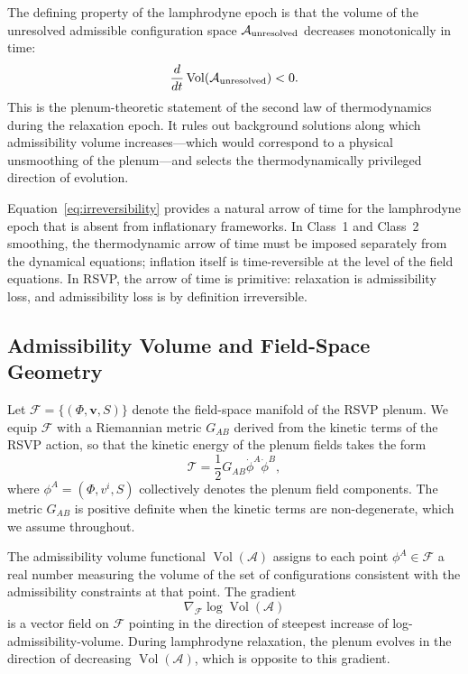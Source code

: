 \documentclass[12pt, a4paper]{article}
\newcommand{\vv}{\mathbf{v}}
\newcommand{\calA}{\mathcal{A}}
\newcommand{\calF}{\mathcal{F}}
\newcommand{\Vol}{\operatorname{Vol}}
\begin{document}
The defining property of the lamphrodyne epoch is that the volume of the
unresolved admissible configuration space $\calA_{\rm unresolved}$ decreases
monotonically in time:
\begin{equation}
\frac{d}{dt}\Vol(\calA_{\rm unresolved}) < 0.
\label{eq:irreversibility}
\end{equation}
This is the plenum-theoretic statement of the second law of thermodynamics during
the relaxation epoch. It rules out background solutions along which admissibility
volume increases---which would correspond to a physical unsmoothing of the
plenum---and selects the thermodynamically privileged direction of evolution.

Equation~\eqref{eq:irreversibility} provides a natural arrow of time for the
lamphrodyne epoch that is absent from inflationary frameworks. In Class~1 and
Class~2 smoothing, the thermodynamic arrow of time must be imposed separately from
the dynamical equations; inflation itself is time-reversible at the level of the
field equations. In RSVP, the arrow of time is primitive: relaxation is
admissibility loss, and admissibility loss is by definition irreversible.

\subsection{Admissibility Volume and Field-Space Geometry}
\label{sec:fieldspace}

Let $\calF = \{(\Phi, \vv, S)\}$ denote the field-space manifold of the RSVP
plenum. We equip $\calF$ with a Riemannian metric $G_{AB}$ derived from the kinetic
terms of the RSVP action, so that the kinetic energy of the plenum fields takes the
form
\begin{equation}
\mathcal{T} = \frac{1}{2}G_{AB}\dot{\phi}^A\dot{\phi}^B,
\end{equation}
where $\phi^A = (\Phi, v^i, S)$ collectively denotes the plenum field components.
The metric $G_{AB}$ is positive definite when the kinetic terms are non-degenerate,
which we assume throughout.

The admissibility volume functional $\Vol(\calA)$ assigns to each point
$\phi^A \in \calF$ a real number measuring the volume of the set of configurations
consistent with the admissibility constraints at that point. The gradient
\begin{equation}
\nabla_{\calF}\log\Vol(\calA)
\end{equation}
is a vector field on $\calF$ pointing in the direction of steepest increase of log-
admissibility-volume. During lamphrodyne relaxation, the plenum evolves in the
direction of decreasing $\Vol(\calA)$, which is opposite to this gradient.
\end{document}
